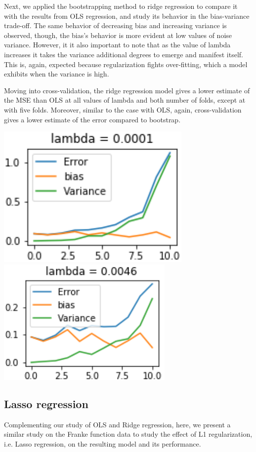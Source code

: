 \documentclass{article}
\begin{document}
Next, we applied the bootstrapping method to ridge regression to compare it with the results from OLS regression, and study its behavior in the bias-variance trade-off. The same behavior of decreasing bias and increasing variance is observed, though, the bias’s behavior is more evident at low values of noise variance. However, it it also important to note that as the value of lambda increases it takes the variance additional degrees to emerge and manifest itself. This is, again, expected because regularization fights over-fitting, which a model exhibits when the variance is high.

Moving into cross-validation, the ridge regression model gives a lower estimate of the MSE than OLS at all values of lambda and both number of folds, except at  with five folds. Moreover, similar to the case with OLS, again, cross-validation gives a lower estimate of the error compared to bootstrap.

\includegraphics[scale=1]{boostrapridge0.png}
\includegraphics[scale=1]{boostrapridge1.png}

\subsection{Lasso regression}
Complementing our study of OLS and Ridge regression, here, we present a similar study on the Franke function data to study the effect of L1 regularization, i.e. Lasso regression, on the resulting model and its performance.
\end{document}
